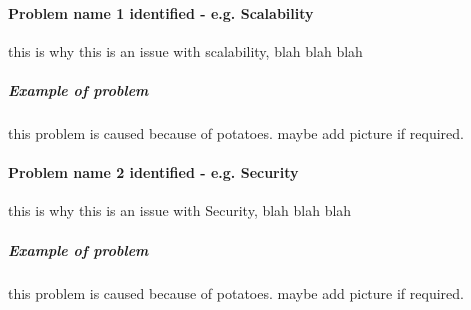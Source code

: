 
\paragraph{Problem name 1 identified - e.g. Scalability}
	this is why this is an issue with scalability, blah blah blah
	\subparagraph{Example of problem}
		this problem is caused because of potatoes. maybe add picture if required.
	
\paragraph{Problem name 2 identified - e.g. Security}
	this is why this is an issue with Security, blah blah blah
	\subparagraph{Example of problem}
		this problem is caused because of potatoes. maybe add picture if required.
